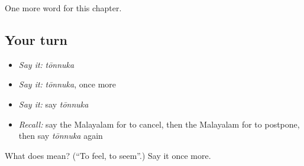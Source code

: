 \begin{grammarlens}[title={What you've built}]
One more word for this chapter.
\end{grammarlens}

\subsection*{Your turn}
\begin{itemize}
\raggedright
  \item \emph{Say it:} \emph{tōnnuka}
  \item \emph{Say it:} \emph{tōnnuka}, once more
  \item \emph{Say it:} say \emph{tōnnuka}
  \item \emph{Recall:} say the Malayalam for to cancel, then the Malayalam for to postpone, then say \emph{tōnnuka} again
\end{itemize}

\begin{tcolorbox}[breakable,colback=teal!4,colframe=teal!35!black,title={Before you move on}]
What does  mean? (\textquotedblleft{}To feel, to seem\textquotedblright{}.) Say it once more.
\end{tcolorbox}
